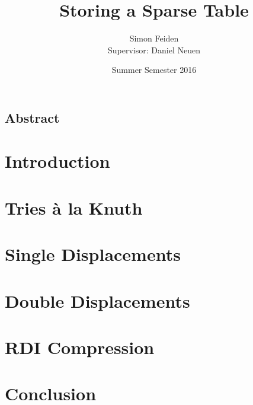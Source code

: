 \documentclass[12pt]{article}
\title{Storing a Sparse Table}
\date{Summer Semester 2016}
\author{Simon Feiden\\Supervisor: Daniel Neuen}
\begin{document}
\maketitle
\thispagestyle{empty}

\vspace*{2em}

\begin{center}
	\begin{minipage}[t]{0.8\textwidth}
		\section*{Abstract} %
		
	\end{minipage}
\end{center}
\newpage



\section*{Introduction}




\section*{Tries à la Knuth}




\section*{Single Displacements}



\section*{Double Displacements}




\section*{RDI Compression}




\section*{Conclusion}

\newpage




\end{document}
